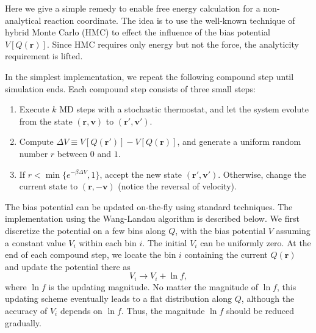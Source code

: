 \documentclass{article}
\newcommand{\vct}[1]{\mathbf{#1}}
\newcommand{\vr}{\vct{r}}
\newcommand{\vv}{\vct{v}}
\begin{document}
%
Here we give a simple remedy
to enable free energy calculation
for a non-analytical reaction coordinate.
%
The idea is to use
the well-known technique of hybrid Monte Carlo (HMC)
to effect the influence of the bias potential $V[Q(\vr)]$.
%
Since HMC requires only energy but not the force,
the analyticity requirement is lifted.



%
In the simplest implementation,
we repeat the following compound step until simulation ends.
%
Each compound step consists of three small steps:
%
\begin{enumerate}
  \item Execute $k$ MD steps with a stochastic thermostat,
        and let the system evolute
        from the state $(\vr, \vv)$ to $(\vr', \vv')$.

  \item Compute $\Delta V \equiv V[Q(\vr')] - V[Q(\vr)]$,
        and generate a uniform random number $r$ between $0$ and $1$.

  \item If $r < \min\{e^{-\beta \Delta V}, 1\}$,
        accept the new state $(\vr', \vv')$.
        Otherwise, change the current state to $(\vr, -\vv)$
        (notice the reversal of velocity).
\end{enumerate}



%
The bias potential can be updated on-the-fly
using standard techniques.
%
The implementation using the Wang-Landau algorithm
is described below.
%
We first discretize the potential on a few bins along $Q$,
with the bias potential $V$ assuming a constant value $V_i$
within each bin $i$.
%
The initial $V_i$ can be uniformly zero.
%
At the end of each compound step,
we locate the bin $i$ containing the current $Q(\vr)$
and update the potential there as
%
\begin{equation}
V_i \rightarrow V_i + \ln f,
\end{equation}
%
where $\ln f$ is the updating magnitude.
%
No matter the magnitude of $\ln f$,
this updating scheme eventually leads to a flat distribution along $Q$,
although the accuracy of $V_i$ depends on $\ln f$.
%
Thus, the magnitude $\ln f$ should be reduced gradually.


\end{document}
